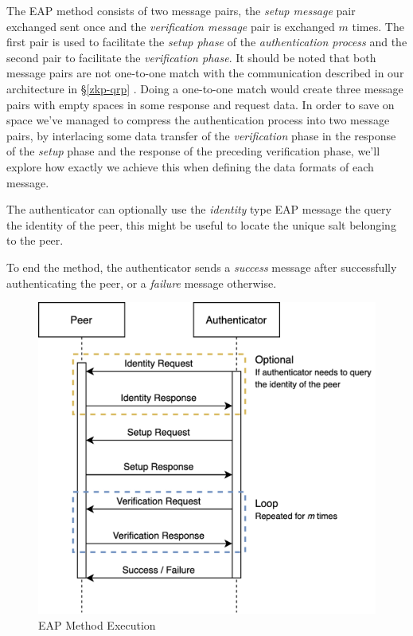 The EAP method consists of two message pairs, the \textit{setup message} pair exchanged sent once and the \textit{verification message} pair is exchanged $m$ times.
The first pair is used to facilitate the \textit{setup phase} of the \textit{authentication process} and the second pair to facilitate the \textit{verification phase}.
It should be noted that both message pairs are not one-to-one match with the communication described in our architecture in \S\ref{zkp-qrp} . 
Doing a one-to-one match would create three message pairs with empty spaces in some response and request data.
In order to save on space we've managed to compress the authentication process into two message pairs, by interlacing some data transfer of the \textit{verification} phase in the response of the \textit{setup} phase and the response of the preceding verification phase, we'll explore how exactly we achieve this when defining the data formats of each message.

The authenticator can optionally use the \textit{identity} type EAP message the query the identity of the peer, this might be useful to locate the unique salt belonging to the peer.

To end the method, the authenticator sends a \textit{success} message after successfully authenticating the peer, or a \textit{failure} message otherwise.

\begin{figure}[h]
	\centering
	\includegraphics[width=12cm]{images/EAP_Method.png}
	\caption{EAP Method Execution}
	\label{fig:eap-method-protocol}
\end{figure}

